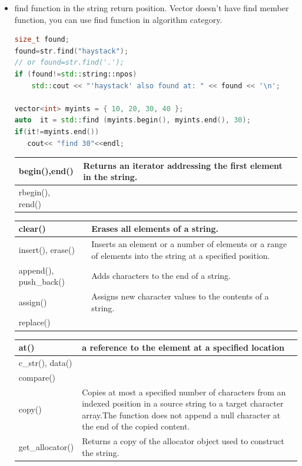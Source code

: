 \documentclass[a4paper,12pt,twoside]{book}
\begin{document}
\begin{itemize}
\item find function in the string return position. Vector doesn't have find member function, you can use find function in  algorithm category.

\begin{lstlisting}[frame=single, language=c++]
size_t found;
found=str.find("haystack");
// or found=str.find('.');
if (found!=std::string::npos)
    std::cout << "'haystack' also found at: " << found << '\n';

vector<int> myints = { 10, 20, 30, 40 };
auto  it = std::find (myints.begin(), myints.end(), 30);
if(it!=myints.end())
   cout<< "find 30"<<endl;
\end{lstlisting}


\begin{tabular}{| p{} |p{}|}
\hline
begin(),end() & Returns an iterator addressing the first element in the string.\\
\hline
rbegin(), rend() & \\
\hline

\end{tabular}


\begin{tabular}{| p{} |p{}|}
\hline
clear()& Erases all elements of a string.\\
\hline
insert(), erase() & Inserts an element or a number of elements or a range of elements into the string at a specified position.\\
\hline
append(), push\_back() & Adds characters to the end of a string.\\
\hline
assign() &Assigns new character values to the contents of a string.\\
\hline
replace() & \\
\hline
\end{tabular}

\begin{tabular}{| p{} |p{}|}

\hline
at() & a reference to the element at a specified location \\
\hline
c\_str(), data() & \\
\hline
compare()& \\
\hline
copy() & Copies at most a specified number of characters from an indexed position in a source string to a target character array.The function does not append a null character at the end of the copied content.
\\
\hline
get\_allocator() & Returns a copy of the allocator object used to construct the string.\\
\hline



\end{tabular}
\end{itemize}
\end{document}
